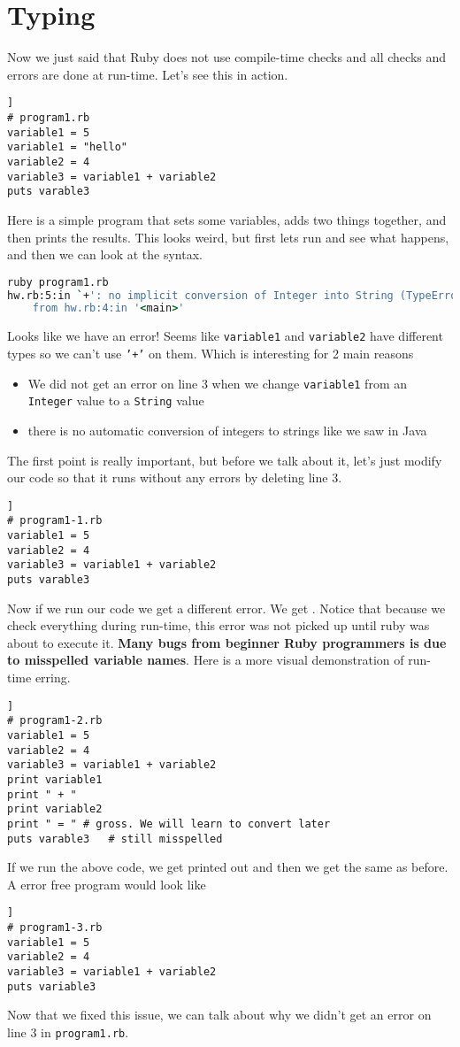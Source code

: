 \documentclass[main.tex]{subfiles}
\begin{document}
\section{Typing}

Now we just said that Ruby does not use compile-time checks and all checks and errors are done at run-time. Let's see this in action.
\begin{lstlisting}[style=MyRubyStyle]]
# program1.rb
variable1 = 5
variable1 = "hello"
variable2 = 4
variable3 = variable1 + variable2
puts varable3
\end{lstlisting}
Here is a simple program that sets some variables, adds two things together, and then prints the results.
This looks weird, but first lets run and see what happens, and then we can look at the syntax. 
\begin{lstlisting}[language=csh]
ruby program1.rb
hw.rb:5:in `+': no implicit conversion of Integer into String (TypeError) 
    from hw.rb:4:in '<main>'
\end{lstlisting}
Looks like we have an error! Seems like \texttt{variable1} and \texttt{variable2} have different types so we can't use \texttt{'+'} on them.
Which is interesting for 2 main reasons
\begin{itemize}
    \item We did not get an error on line 3 when we change \texttt{variable1} from an \texttt{Integer} value to a \texttt{String} value
    \item there is no automatic conversion of integers to strings like we saw in Java
\end{itemize}
The first point is really important, but before we talk about it, let's just modify our code so that it runs without any errors by deleting line 3.
\begin{lstlisting}[style=MyRubyStyle]]
# program1-1.rb
variable1 = 5
variable2 = 4
variable3 = variable1 + variable2
puts varable3
\end{lstlisting}
Now if we run our code we get a different error. 
We get . 
Notice that because we check everything during run-time, this error was not picked up until ruby was about to execute it. 
\textbf{Many bugs from beginner Ruby programmers is due to misspelled variable names}.
Here is a more visual demonstration of run-time erring.
\begin{lstlisting}[style=MyRubyStyle]]
# program1-2.rb
variable1 = 5
variable2 = 4
variable3 = variable1 + variable2
print variable1
print " + "
print variable2
print " = " # gross. We will learn to convert later
puts varable3   # still misspelled
\end{lstlisting}
If we run the above code, we get  printed out and then we get the same  as before. 
A error free program would look like 
\begin{lstlisting}[style=MyRubyStyle]]
# program1-3.rb
variable1 = 5
variable2 = 4
variable3 = variable1 + variable2
puts variable3
\end{lstlisting}
Now that we fixed this issue, we can talk about why we didn't get an error on line 3 in \texttt{program1.rb}.
\end{document}
